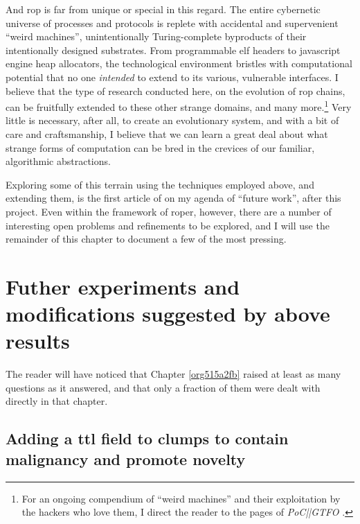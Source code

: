 \documentclass[12pt,glossary]{dalthesis}
\begin{document}
And \gls{rop} is far from unique or special in this regard. The entire cybernetic
universe of processes and protocols is replete with accidental and supervenient
``weird machines'', unintentionally Turing-complete byproducts of their intentionally
designed substrates. From programmable \gls{elf} headers to javascript engine heap
allocators, the technological environment bristles with computational potential
that no one \emph{intended} to extend to its various, vulnerable interfaces. I believe
that the type of research conducted here, on the evolution of \gls{rop} chains, can
be fruitfully extended to these other strange domains, and many more.\footnote{For an ongoing compendium of ``weird machines'' and their exploitation by the
  hackers who love them, I direct the reader to the pages of \emph{PoC||GTFO}
  \cite{pocorgtfo}.} Very little
is necessary, after all, to create an evolutionary system, and with a bit of care
and craftsmanship, I believe that we can learn a great deal about what strange
forms of computation can be bred in the crevices of our familiar, algorithmic
abstractions. 

Exploring some of this terrain using the techniques employed above, and
extending them, is the first article of on my agenda of ``future work'',
after this project. Even within the framework of \gls{roper}, however, there
are a number of interesting open problems and refinements to be explored,
and I will use the remainder of this chapter to document a few of the most
pressing.


\section{Futher experiments and modifications suggested by above results}
\label{sec:org8ce2c9b}

The reader will have noticed that Chapter \ref{org515a2fb} raised at least
as many questions as it answered, and that only a fraction of them were dealt
with directly in that chapter. 

\subsection{Adding a \gls{ttl} field to clumps to contain malignancy and promote novelty}
\label{sec:org16db761}
\end{document}
